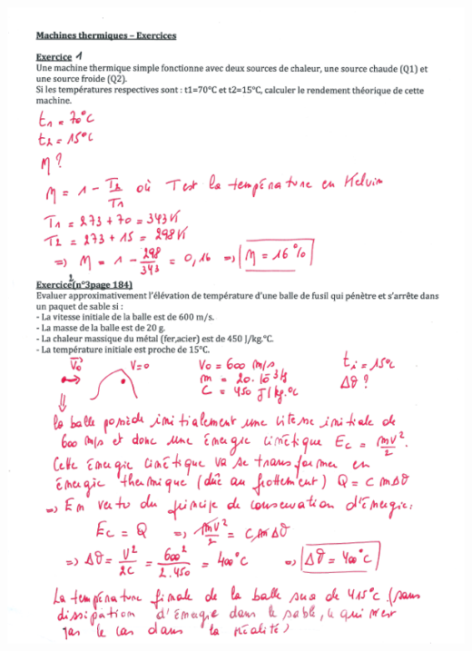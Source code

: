 \includegraphics[width=19.239cm,height=26.741cm]{Pictures/10000001000002530000033C4DAAA30BE8CDB504.png}

